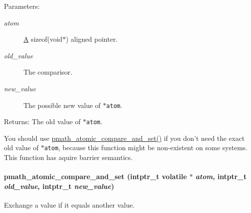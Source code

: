 \begin{Desc}
\item[Parameters:]
\begin{description}
\item[{\em atom}]\hyperlink{class_a}{A} sizeof(void$\ast$) aligned pointer. \item[{\em old\_\-value}]The comparisor. \item[{\em new\_\-value}]The possible new value of {\tt $\ast$atom}. \end{description}
\end{Desc}
\begin{Desc}
\item[Returns:]The old value of {\tt $\ast$atom}.\end{Desc}
You should use \hyperlink{group__atomic__ops_g8e2ec6134e5f1161aed5c890abb2e53b}{pmath\_\-atomic\_\-compare\_\-and\_\-set()} if you don't need the exact old value of {\tt $\ast$atom}, because this function might be non-existent on some systems. This function has aquire barrier semantics. \hypertarget{group__atomic__ops_g8e2ec6134e5f1161aed5c890abb2e53b}{
\paragraph[{pmath\_\-atomic\_\-compare\_\-and\_\-set}]{ pmath\_\-atomic\_\-compare\_\-and\_\-set (intptr\_\-t volatile $\ast$ {\em atom}, \/  intptr\_\-t {\em old\_\-value}, \/  intptr\_\-t {\em new\_\-value})}\hfill}
\label{group__atomic__ops_g8e2ec6134e5f1161aed5c890abb2e53b}


Exchange a value if it equals another value. 

